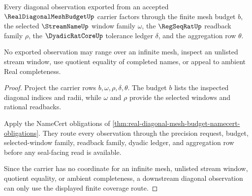 \begin{theorem}
\label{thm:real-diagonal-mesh-budget-window-coverage}
Every diagonal observation exported from an accepted $\RealDiagonalMeshBudgetUp$ carrier factors through the finite mesh budget $b$, the selected $\StreamNameUp$ window family $\omega$, the $\RegSeqRatUp$ readback family $\rho$, the $\DyadicRatCoreUp$ tolerance ledger $\delta$, and the aggregation row $\theta$.

No exported observation may range over an infinite mesh, inspect an unlisted stream window, use quotient equality of completed names, or appeal to ambient Real completeness.
\end{theorem}
\begin{proof}
Project the carrier rows $b,\omega,\rho,\delta,\theta$. The budget $b$ lists the inspected diagonal indices and radii, while $\omega$ and $\rho$ provide the selected windows and rational readbacks.

Apply the NameCert obligations of \autoref{thm:real-diagonal-mesh-budget-namecert-obligations}. They route every observation through the precision request, budget, selected-window family, readback family, dyadic ledger, and aggregation row before any seal-facing read is available.

Since the carrier has no coordinate for an infinite mesh, unlisted stream window, quotient equality, or ambient completeness, a downstream diagonal observation can only use the displayed finite coverage route.
\end{proof}

